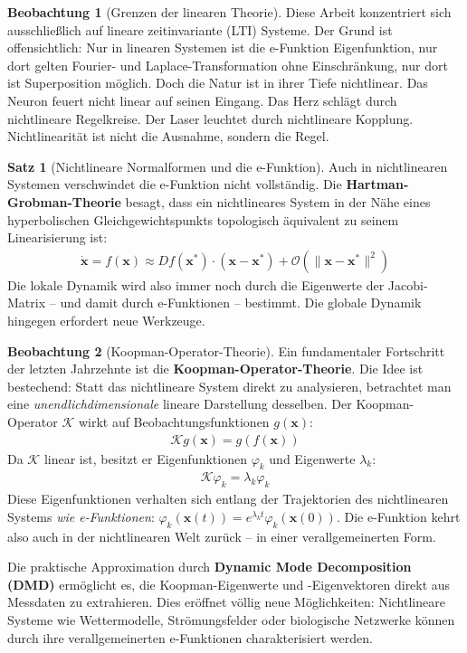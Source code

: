 ﻿\documentclass[a4paper,12pt]{report}
\theoremstyle{definition}
\newtheorem{satz}{Satz}
\newtheorem{beobachtung}{Beobachtung}
\begin{document}
	\begin{beobachtung}[Grenzen der linearen Theorie]
		Diese Arbeit konzentriert sich ausschließlich auf lineare zeitinvariante (LTI) Systeme. Der Grund ist offensichtlich: Nur in linearen Systemen ist die e-Funktion Eigenfunktion, nur dort gelten Fourier- und Laplace-Transformation ohne Einschränkung, nur dort ist Superposition möglich. Doch die Natur ist in ihrer Tiefe nichtlinear. Das Neuron feuert nicht linear auf seinen Eingang. Das Herz schlägt durch nichtlineare Regelkreise. Der Laser leuchtet durch nichtlineare Kopplung. Nichtlinearität ist nicht die Ausnahme, sondern die Regel.
	\end{beobachtung}
	
	\begin{satz}[Nichtlineare Normalformen und die e-Funktion]
		Auch in nichtlinearen Systemen verschwindet die e-Funktion nicht vollständig. Die \textbf{Hartman-Grobman-Theorie} besagt, dass ein nichtlineares System in der Nähe eines hyperbolischen Gleichgewichtspunkts topologisch äquivalent zu seinem Linearisierung ist:
		\begin{align}
			\dot{\mathbf{x}} = f(\mathbf{x}) \approx Df(\mathbf{x}^*) \cdot (\mathbf{x} - \mathbf{x}^*) + \mathcal{O}(\|\mathbf{x} - \mathbf{x}^*\|^2)
		\end{align}
		Die lokale Dynamik wird also immer noch durch die Eigenwerte der Jacobi-Matrix -- und damit durch e-Funktionen -- bestimmt. Die globale Dynamik hingegen erfordert neue Werkzeuge.
	\end{satz}
	
	\begin{beobachtung}[Koopman-Operator-Theorie]
		Ein fundamentaler Fortschritt der letzten Jahrzehnte ist die \textbf{Koopman-Operator-Theorie}. Die Idee ist bestechend: Statt das nichtlineare System direkt zu analysieren, betrachtet man eine \emph{unendlichdimensionale} lineare Darstellung desselben. Der Koopman-Operator $\mathcal{K}$ wirkt auf Beobachtungsfunktionen $g(\mathbf{x})$:
		\begin{align}
			\mathcal{K} g(\mathbf{x}) = g(f(\mathbf{x}))
		\end{align}
		Da $\mathcal{K}$ linear ist, besitzt er Eigenfunktionen $\varphi_k$ und Eigenwerte $\lambda_k$:
		\begin{align}
			\mathcal{K} \varphi_k = \lambda_k \varphi_k
		\end{align}
		Diese Eigenfunktionen verhalten sich entlang der Trajektorien des nichtlinearen Systems \emph{wie e-Funktionen}: $\varphi_k(\mathbf{x}(t)) = e^{\lambda_k t} \varphi_k(\mathbf{x}(0))$. Die e-Funktion kehrt also auch in der nichtlinearen Welt zurück -- in einer verallgemeinerten Form.
		
		Die praktische Approximation durch \textbf{Dynamic Mode Decomposition (DMD)} ermöglicht es, die Koopman-Eigenwerte und -Eigenvektoren direkt aus Messdaten zu extrahieren. Dies eröffnet völlig neue Möglichkeiten: Nichtlineare Systeme wie Wettermodelle, Strömungsfelder oder biologische Netzwerke können durch ihre verallgemeinerten e-Funktionen charakterisiert werden.
	\end{beobachtung}
	
\end{document}
